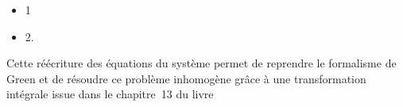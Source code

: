 \begin{itemize} \color{red}
	\item 1
	\item 2.
\end{itemize}

Cette réécriture des équations du système permet de reprendre le formalisme de Green et de résoudre ce problème inhomogène grâce à une transformation intégrale issue dans le chapitre~13 du livre \cite{ozisik_heat_1993, ozisik_integraltransform_heat_1993}






